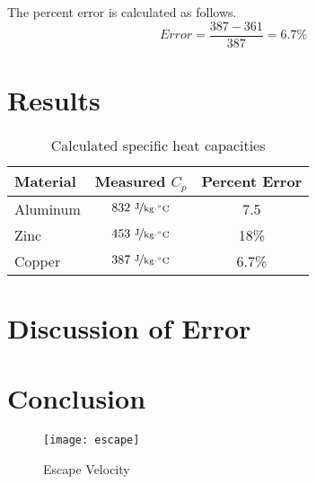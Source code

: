 \documentclass{article}
\begin{document}
The percent error is calculated as follows.
$$Error=\frac{387-361}{387}=6.7\%$$



\section{Results}

\begin{table}[htbp]
\begin{center}
\footnotesize
\begin{tabular}{lcc}
\toprule
 Material  & Measured $C_p$ & Percent Error\\                                                      
\midrule
  
    Aluminum   & $832\   \nicefrac{ \text{J}}{\text{kg}\cdot {}^{\circ}\text{C}}$ &   7.5   \\
    Zinc     & $453\  \nicefrac{ \text{J}}{\text{kg}\cdot {}^{\circ}\text{C}}$  & 18\%   \\
     Copper     & $387\   \nicefrac{ \text{J}}{\text{kg}\cdot {}^{\circ}\text{C}}$   & 6.7\%   \\
    
\bottomrule
\end{tabular}
\end{center}
  \caption{Calculated specific heat capacities}
  \label{tab:font-sizes}
\end{table}


 \section{Discussion of Error}
 
 \section{Conclusion}


\begin{figure}[h]
\begin{center}
\texttt{[image: escape]} %
\caption{Escape Velocity}
\end{center}
\end{figure}

\newpage








\end{document}
